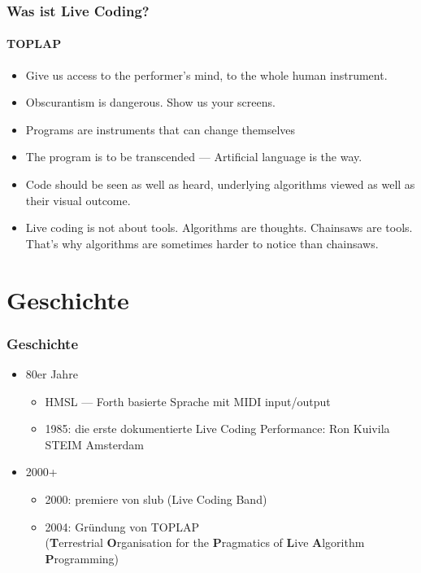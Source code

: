 \documentclass{beamer}
\begin{document}
\begin{frame}
  \frametitle{Was ist Live Coding?}
  \framesubtitle{TOPLAP}
  \small
  \begin{itemize}
    \item Give us access to the performer's mind, to the whole human instrument.
    \item Obscurantism is dangerous. Show us your screens.
    \item Programs are instruments that can change themselves
    \item The program is to be transcended --- Artificial language is the way.
    \item Code should be seen as well as heard, underlying algorithms viewed as well as their visual outcome.
    \item Live coding is not about tools. Algorithms are thoughts. Chainsaws are tools. That's why algorithms are sometimes harder to notice than chainsaws.
  \end{itemize}
\end{frame}

\section{Geschichte}
\begin{frame}
  \frametitle{Geschichte}
  \begin{itemize}
    \item 80er Jahre
      \begin{itemize}
        \item HMSL --- Forth basierte Sprache mit MIDI input/output
        \item 1985: die erste dokumentierte Live Coding Performance: Ron Kuivila STEIM Amsterdam
      \end{itemize}
    \item 2000+
      \begin{itemize}
        \item 2000: premiere von slub (Live Coding Band)
        \item 2004: Gründung von TOPLAP \\ (\textbf{T}errestrial \textbf{O}rganisation for the \textbf{P}ragmatics of \textbf{L}ive \textbf{A}lgorithm \textbf{P}rogramming)
      \end{itemize}
  \end{itemize}
\end{frame}
\end{document}
